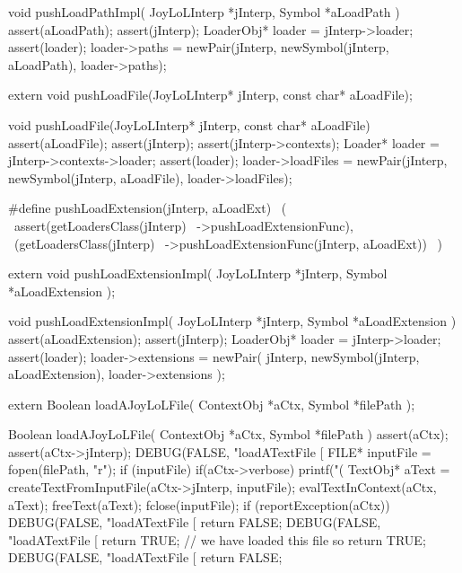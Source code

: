 \startCCode
void pushLoadPathImpl(
  JoyLoLInterp *jInterp,
  Symbol       *aLoadPath
) {
  assert(aLoadPath);
  assert(jInterp);
  LoaderObj* loader = jInterp->loader;
  assert(loader);
  loader->paths =
    newPair(jInterp, newSymbol(jInterp, aLoadPath), loader->paths);
}
\stopCCode

\starttyping
\startCHeader
extern void pushLoadFile(JoyLoLInterp* jInterp, const char* aLoadFile);
\stopCHeader

\startCCode
void pushLoadFile(JoyLoLInterp* jInterp, const char* aLoadFile) {
  assert(aLoadFile);
  assert(jInterp);
  assert(jInterp->contexts);
  Loader* loader = jInterp->contexts->loader;
  assert(loader);
  loader->loadFiles =
    newPair(jInterp, newSymbol(jInterp, aLoadFile), loader->loadFiles);
}
\stopCCode
\stoptyping

\startCHeader
#define pushLoadExtension(jInterp, aLoadExt)      \
  (                                               \
    assert(getLoadersClass(jInterp)               \
      ->pushLoadExtensionFunc),                   \
    (getLoadersClass(jInterp)                     \
      ->pushLoadExtensionFunc(jInterp, aLoadExt)) \
  )
\stopCHeader

\setCHeaderStream{private}
\startCHeader
extern void pushLoadExtensionImpl(
  JoyLoLInterp *jInterp,
  Symbol       *aLoadExtension
);
\stopCHeader
{}

\startCCode
void pushLoadExtensionImpl(
  JoyLoLInterp *jInterp,
  Symbol       *aLoadExtension
) {
  assert(aLoadExtension);
  assert(jInterp);
  LoaderObj* loader = jInterp->loader;
  assert(loader);
  loader->extensions =
    newPair(
      jInterp, 
      newSymbol(jInterp, aLoadExtension),
      loader->extensions
    );
}
\stopCCode

\setCHeaderStream{private}
\startCHeader
extern Boolean loadAJoyLoLFile(
  ContextObj *aCtx,
  Symbol     *filePath
);
\stopCHeader
{}

\startCCode
Boolean loadAJoyLoLFile(
  ContextObj *aCtx,
  Symbol     *filePath
) {
  assert(aCtx);
  assert(aCtx->jInterp);
  DEBUG(FALSE, "loadATextFile [%
  FILE* inputFile = fopen(filePath, "r");
  if (inputFile) {
    if(aCtx->verbose) printf("(%
    TextObj* aText =
      createTextFromInputFile(aCtx->jInterp, inputFile);
    evalTextInContext(aCtx, aText);
    freeText(aText);
    fclose(inputFile);
    if (reportException(aCtx)) {
      DEBUG(FALSE, "loadATextFile [%
      return FALSE;
    }
    DEBUG(FALSE, "loadATextFile [%
    return TRUE; // we have loaded this file so return TRUE;
  }
  DEBUG(FALSE, "loadATextFile [%
  return FALSE;
}
\stopCCode

